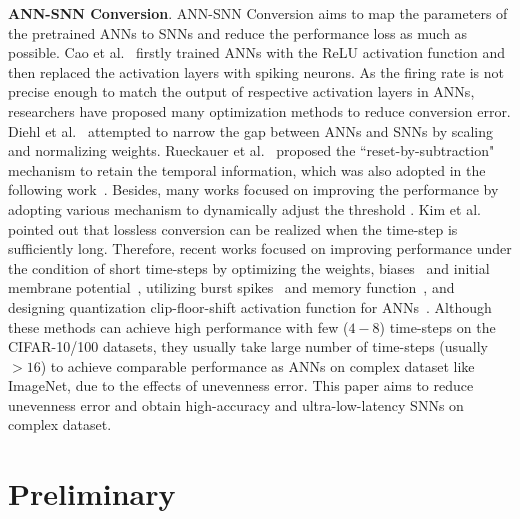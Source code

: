 \documentclass[letterpaper]{article} %
\begin{document}
\textbf{ANN-SNN Conversion}. ANN-SNN Conversion aims to map the parameters of the pretrained ANNs to SNNs and reduce the performance loss as much as possible.  Cao et al.~ firstly trained ANNs with the ReLU activation function and then replaced the activation layers with spiking neurons. As the firing rate is not precise enough to match the output of respective activation layers in ANNs, researchers have proposed many optimization methods to reduce conversion error. Diehl et al.~ attempted to narrow the gap between ANNs and SNNs by scaling and normalizing weights. Rueckauer et al.~ proposed the ``reset-by-subtraction" mechanism to retain the temporal information, which was also adopted in the following work~\cite{han2020rmp,deng2020optimal,bu2022optimal}. Besides,
many works focused on improving the performance by adopting various mechanism to dynamically adjust the threshold \cite{Bodo2017Conversion,sengupta2019going,han2020rmp,ding2021optimal,stockl2021optimized,ho2021tcl,wu2021tandem}. Kim et al.~ pointed out that lossless conversion can be realized when the time-step is sufficiently long. Therefore, recent works focused on improving performance under the condition of short time-steps by optimizing the weights, biases~\cite{deng2020optimal,li2021free} and initial membrane potential~\cite{Bu2022OPI}, utilizing burst spikes~\cite{li2022efficient} and memory function~\cite{wang2022signed}, and designing quantization clip-floor-shift activation function for ANNs~\cite{bu2022optimal}.
Although these methods can achieve high performance with few ($4-8$) time-steps on the CIFAR-10/100 datasets, they usually take large number of time-steps (usually $>16$) to achieve comparable performance as ANNs on complex dataset like ImageNet, due to the effects of unevenness error. This paper aims to reduce unevenness error and obtain high-accuracy and ultra-low-latency SNNs on complex dataset.



\section{Preliminary}
\end{document}
